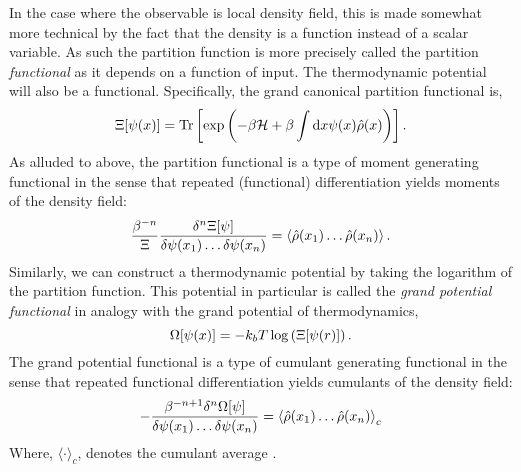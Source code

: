 In the case where the observable is local density field, this is made somewhat
more technical by the fact that the density is a function instead of a scalar
variable.  As such the partition function is more precisely called the
partition \textit{functional} as it depends on a function of input. The
thermodynamic potential will also be a functional.  Specifically, the grand
canonical partition functional is,
%
\begin{equation}
    \Xi[\psi(x)] = \mathrm{Tr}\left[ \exp\left(-\beta\mathcal{H} +\beta\int\mathrm{d}x
        \psi(x) \hat{\rho}(x)\right) \right].
\end{equation}
%
As alluded to above, the partition functional is a type of moment generating
functional in the sense that repeated (functional) differentiation yields
moments of the density field:
%
\begin{equation}
    \frac{\beta^{-n}}{\Xi} \frac{\delta^n \Xi[\psi]}{\delta \psi(x_1) \dots \delta\psi(x_n)} 
        = \left\langle \hat{\rho}(x_1)\dots\hat{\rho}(x_n) \right\rangle.
\end{equation}
%
Similarly, we can construct a thermodynamic potential by taking the logarithm
of the partition function. This potential in particular is called the
\textit{grand potential functional} in analogy with the grand potential of
thermodynamics,
%
\begin{equation}
    \Omega[\psi(x)] = -k_bT\log\left(\Xi[\psi(r)]\right).
\end{equation}
%
The grand potential functional is a type of cumulant generating functional in
the sense that repeated functional differentiation yields cumulants of the
density field:
%
\begin{equation}
    -\frac{\beta^{-n + 1}\delta^n\Omega[\psi]}{\delta\psi(x_1)\dots\delta\psi(x_n)}
        = \left\langle \hat{\rho}(x_1)\dots\hat{\rho}(x_n) \right\rangle_c
\end{equation}
%
Where, $\langle \cdot \rangle_c$, denotes the cumulant average \cite{KUBO62}.

